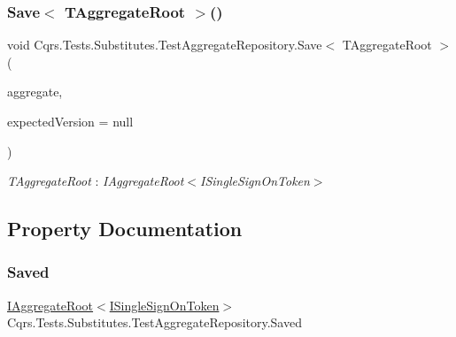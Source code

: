 \subsubsection{\texorpdfstring{Save$<$ T\+Aggregate\+Root $>$()}{Save< TAggregateRoot >()}}
{\footnotesize\ttfamily void Cqrs.\+Tests.\+Substitutes.\+Test\+Aggregate\+Repository.\+Save$<$ T\+Aggregate\+Root $>$ (\begin{DoxyParamCaption}\item[{T\+Aggregate\+Root}]{aggregate,  }\item[{int?}]{expected\+Version = {\ttfamily null} }\end{DoxyParamCaption})}

\begin{Desc}
\item[Type Constraints]\begin{description}
\item[{\em T\+Aggregate\+Root} : {\em I\+Aggregate\+Root$<$I\+Single\+Sign\+On\+Token$>$}]\end{description}
\end{Desc}


\subsection{Property Documentation}
\mbox{\label{classCqrs_1_1Tests_1_1Substitutes_1_1TestAggregateRepository_a5dae460d63c66ee005d2c11eb228388f_a5dae460d63c66ee005d2c11eb228388f}} 
\subsubsection{\texorpdfstring{Saved}{Saved}}
{\footnotesize\ttfamily \hyperlink{interfaceCqrs_1_1Domain_1_1IAggregateRoot}{I\+Aggregate\+Root}$<$\hyperlink{interfaceCqrs_1_1Authentication_1_1ISingleSignOnToken}{I\+Single\+Sign\+On\+Token}$>$ Cqrs.\+Tests.\+Substitutes.\+Test\+Aggregate\+Repository.\+Saved\hspace{0.3cm}{\ttfamily [get]}}

